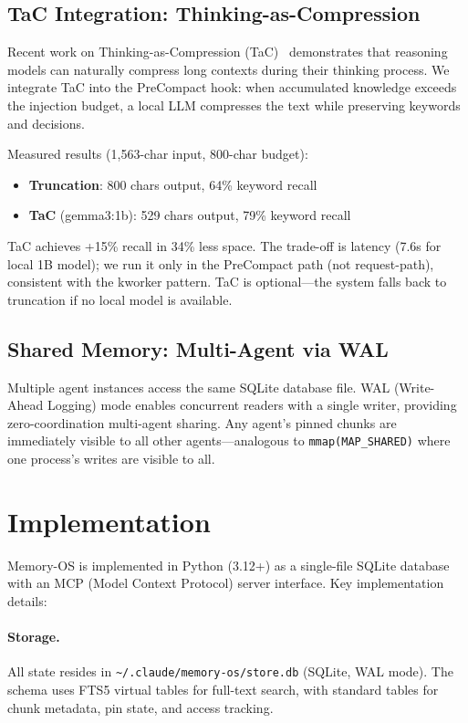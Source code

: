\documentclass[10pt,twocolumn]{article}
\begin{document}
\subsection{TaC Integration: Thinking-as-Compression}

Recent work on Thinking-as-Compression (TaC)~\cite{tac2026} demonstrates that reasoning models can naturally compress long contexts during their thinking process. We integrate TaC into the PreCompact hook: when accumulated knowledge exceeds the injection budget, a local LLM compresses the text while preserving keywords and decisions.

Measured results (1{,}563-char input, 800-char budget):
\begin{itemize}[leftmargin=*,nosep]
  \item \textbf{Truncation}: 800 chars output, 64\% keyword recall
  \item \textbf{TaC} (gemma3:1b): 529 chars output, 79\% keyword recall
\end{itemize}
TaC achieves +15\% recall in 34\% less space. The trade-off is latency (7.6s for local 1B model); we run it only in the PreCompact path (not request-path), consistent with the kworker pattern. TaC is optional---the system falls back to truncation if no local model is available.

\subsection{Shared Memory: Multi-Agent via WAL}

Multiple agent instances access the same SQLite database file. WAL (Write-Ahead Logging) mode enables concurrent readers with a single writer, providing zero-coordination multi-agent sharing. Any agent's pinned chunks are immediately visible to all other agents---analogous to \texttt{mmap(MAP\_SHARED)} where one process's writes are visible to all.

\section{Implementation}
\label{sec:impl}

Memory-OS is implemented in Python (3.12+) as a single-file SQLite database with an MCP (Model Context Protocol) server interface. Key implementation details:

\paragraph{Storage.} All state resides in \texttt{\~{}/.claude/memory-os/store.db} (SQLite, WAL mode). The schema uses FTS5 virtual tables for full-text search, with standard tables for chunk metadata, pin state, and access tracking.
\end{document}
